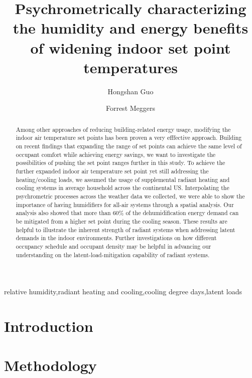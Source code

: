 \documentclass[review]{elsarticle}
\begin{document}
\begin{frontmatter}
\title{Psychrometrically characterizing the humidity and energy benefits of widening indoor set point temperatures}
\author[mysecondaryaddress]{Hongshan Guo}
\author[mymainaddress,mysecondaryaddress]{Forrest Meggers}
\address[mymainaddress]{School of Architecture, Princeton University, USA}
\address[mysecondaryaddress]{Andlinger Center for Energy and the Environment, Princeton University, USA.}
\begin{abstract}
Among other approaches of reducing building-related energy usage, modifying the indoor air temperature set points has been proven a very efffective approach. Building on recent findings that expanding the range of set points can achieve the same level of occupant comfort while achieving energy savings, we want to investigate the possibilities of pushing the set point ranges further in this study. To achieve the further expanded indoor air temperature set point yet still addressing the heating/cooling loads, we assumed the usage of supplemental radiant heating and cooling systems in average household across the continental US. Interpolating the psychrometric processes across the weather data we collected, we were able to show the importance of having humidifiers for all-air systems through a spatial analysis. Our analysis also showed that more than 60\% of the dehumidification energy demand can be mitigated from a higher set point during the cooling season. These results are helpful to illustrate the inherent strength of radiant systems when addressing latent demands in the indoor environments. Further investigations on how different occupancy schedule and occupant density may be helpful in advancing our understanding on the latent-load-mitigation capability of radiant systems.
\end{abstract}
\begin{keyword}relative humidity\sep radiant heating and cooling\sep cooling degree days\sep latent loads\end{keyword}\end{frontmatter}
\tableofcontents
\section{Introduction}

\section{Methodology}
\end{document}
